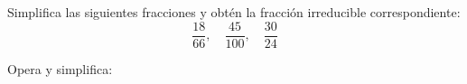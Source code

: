 \documentclass[addpoints,spanish, 12pt,a4paper]{exam}
\begin{document}
\begin{questions}



\question[1] Simplifica las siguientes fracciones y obtén la fracción irreducible correspondiente:  
\[
\dfrac{18}{66}, \quad \dfrac{45}{100}, \quad  \dfrac{30}{24}
\]
\vspace{30pt}

\question Opera y simplifica:  


\end{questions}
\end{document}
